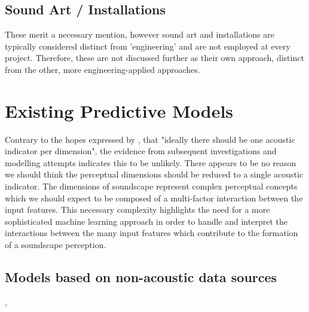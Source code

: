 \subsection{Sound Art / Installations}

These merit a necessary mention, however sound art and installations are typically considered distinct from 'engineering' and are not employed at every project. Therefore, these are not discussed further as their own approach, distinct from the other, more engineering-applied approaches. 



\section{Existing Predictive Models}

Contrary to the hopes expressed by \citet{Aletta2014Towards}, that "ideally there should be one acoustic indicator per dimension", the evidence from subsequent investigations and modelling attempts \citep{Lionello2020systematic} indicates this to be unlikely. There appears to be no reason we should think the perceptual dimensions should be reduced to a single acoustic indicator. The dimensions of soundscape represent complex perceptual concepts which we should expect to be composed of a multi-factor interaction between the input features. This necessary complexity  highlights the need for a more sophisticated machine learning approach in order to handle and interpret the interactions between the many input features which contribute to the formation of a soundscape perception.
\citep{Aletta2016Soundscape}

\citep{Lionello2020systematic}

\subsection{Models based on non-acoustic data sources}

\citep{Verma2020Predicting}, \citep{Gasco2020Social}
